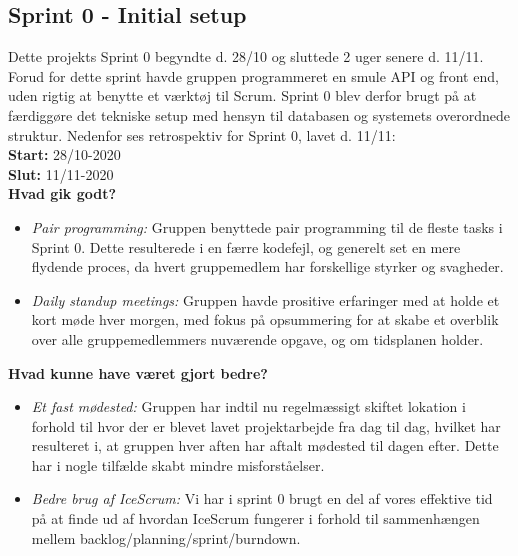 \subsection{Sprint 0 - Initial setup}
Dette projekts Sprint 0 begyndte d. 28/10 og sluttede 2 uger senere d. 11/11. Forud for dette sprint havde
gruppen programmeret en smule API og front end, uden rigtig at benytte et værktøj til Scrum. Sprint 0
blev derfor brugt på at færdiggøre det tekniske setup med hensyn til databasen og systemets overordnede struktur.
Nedenfor ses retrospektiv for Sprint 0, lavet d. 11/11: \\

\textbf{Start:} 28/10-2020 \\
\textbf{Slut:} 11/11-2020 \\

\textbf{Hvad gik godt?}
\begin{itemize}
    \item \textit{Pair programming:} Gruppen benyttede pair programming til de fleste tasks i Sprint 0. Dette resulterede
    i en færre kodefejl, og generelt set en mere flydende proces, da hvert gruppemedlem har forskellige styrker og svagheder.
    \item \textit{Daily standup meetings:} Gruppen havde prositive erfaringer med at holde et kort møde hver morgen, 
    med fokus på opsummering for at skabe et overblik over alle gruppemedlemmers nuværende opgave, og om tidsplanen holder.
\end{itemize}

\textbf{Hvad kunne have været gjort bedre?}
\begin{itemize}
    \item \textit{Et fast mødested:} Gruppen har indtil nu regelmæssigt skiftet lokation i forhold til hvor der er blevet lavet projektarbejde fra dag til dag, 
    hvilket har resulteret i, at gruppen hver aften har aftalt mødested til dagen efter. Dette har i nogle tilfælde skabt mindre misforståelser.
    \item \textit{Bedre brug af IceScrum:} Vi har i sprint 0 brugt en del af vores effektive tid på at finde ud af hvordan IceScrum fungerer
    i forhold til sammenhængen mellem backlog/planning/sprint/burndown.
\end{itemize}

